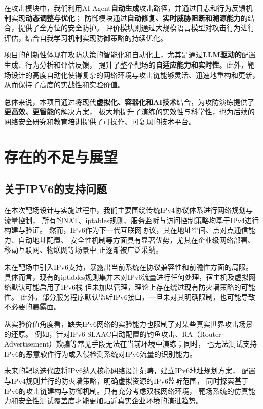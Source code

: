\documentclass[lang=cn,10pt]{elegantbook}
\begin{document}
在攻击模块中，我们利用AI Agent\textbf{自动生成}攻击路径，并通过日志和行为反馈机制实现\textbf{动态调整与优化}；
防御模块通过\textbf{自动修复、实时威胁阻断和溯源能力}的结合，提供了全方位的安全防护。
评价模块则通过大规模语言模型对攻击行为进行评估，结合自我学习机制实现防御策略的持续优化。

项目的创新性体现在攻防决策的智能化和自动化上，尤其是通过\textbf{LLM驱动的}配置生成、行为分析和评估反馈，
提升了整个靶场的\textbf{自适应能力和实时性}。此外，靶场设计的高度自动化使得复杂的网络环境与攻击链能够灵活、迅速地重构和更新，
从而保持了高度的实战性和实验价值。

总体来说，本项目通过将现代\textbf{虚拟化、容器化和AI技术}结合，为攻防演练提供了\textbf{更高效、更智能}的解决方案，
极大地提升了演练的实效性与科学性，也为后续的网络安全研究和教育培训提供了可操作、可复现的技术平台。


\section{存在的不足与展望}

\subsection{关于IPV6的支持问题}

在本次靶场设计与实施过程中，我们主要围绕传统IPv4协议体系进行网络规划与流量控制，
所有的NAT、iptables规则、服务监听与访问控制策略均基于IPv4进行构建与验证。
然而，IPv6作为下一代互联网协议，其在地址空间、点对点通信能力、自动地址配置、
安全性机制等方面具有显著优势，尤其在企业级网络部署、移动互联网、物联网等场景中
正逐渐被广泛采纳。

未在靶场中引入IPv6支持，暴露出当前系统在协议兼容性和前瞻性方面的局限。
具体而言，现有的iptables规则集并未对IPv6流量进行任何处理，宿主机及虚拟网络默认可能启用了IPv6栈
但未加以管理，理论上存在绕过现有防火墙策略的可能性。
此外，部分服务程序默认监听IPv6接口，一旦未对其明确限制，也可能导致不必要的暴露面。

从实验价值角度看，缺失IPv6网络的实验能力也限制了对某些真实世界攻击场景的还原。
例如，针对IPv6 SLAAC自动配置的钓鱼攻击、RA（Router Advertisement）欺骗等常见手段无法在当前环境中演练；同时，
也无法测试支持IPv6的恶意软件行为或入侵检测系统对IPv6流量的识别能力。

未来的靶场迭代应将IPv6纳入核心网络设计范畴，建立IPv6地址规划方案，
配置与IPv4规则并行的防火墙策略，明确虚拟资源的IPv6监听范围，
同时探索基于IPv6的攻击链建构与防御机制。只有充分考虑双栈网络环境，
靶场系统的仿真能力和安全性测试覆盖度才能更加贴近真实企业环境的演进趋势。
\end{document}
